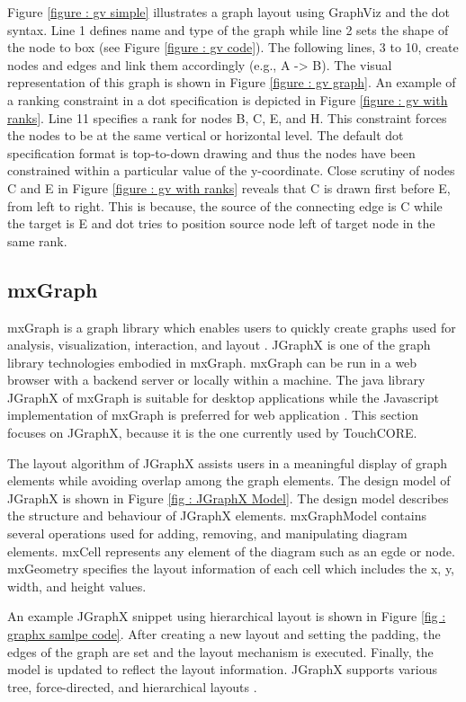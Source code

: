 Figure \ref{figure : gv simple} illustrates a graph layout using GraphViz and the dot syntax.  Line 1 defines name and type of the graph while line 2 sets the shape of the node to box (see Figure \ref{figure : gv code}). The following lines, 3 to 10, create nodes and edges and link them accordingly (e.g., A -> B). The visual representation of this graph is shown in Figure \ref{figure : gv graph}. An example of a ranking constraint in a dot specification is depicted in Figure \ref{figure : gv with ranks}. Line 11 specifies a rank for nodes B, C, E, and H. This constraint forces the nodes to be at the same vertical or horizontal level. The default dot specification format is top-to-down drawing and thus the nodes have been constrained within a particular value of the y-coordinate. Close scrutiny of nodes C and E in Figure \ref{figure : gv with ranks} reveals that C is drawn first before E, from left to right. This is because, the source of the connecting edge is C while the target is E and dot tries to position source node left of target node in the same rank.

\subsection{mxGraph} \label{mxgraph}
 mxGraph is a graph library which enables users to quickly create graphs used for analysis, visualization, interaction, and layout \cite{JgraphX}. JGraphX is one of the graph library technologies embodied in mxGraph. mxGraph can be run in a web browser with a backend server or locally within a machine. The java library JGraphX of mxGraph is suitable for desktop applications while the Javascript implementation of mxGraph is preferred for web application \cite{JgraphX}. This section focuses on JGraphX, because it is the one currently used by TouchCORE. 
 
The layout algorithm of JGraphX assists users in a meaningful display of graph elements while avoiding overlap among the graph elements. The design model of JGraphX is shown in Figure \ref{fig : JGraphX Model}. The design model describes the structure and behaviour of JGraphX elements. mxGraphModel contains several operations used for adding, removing, and manipulating diagram elements. mxCell represents any element of the diagram such as an egde or node. mxGeometry specifies the layout information of each cell which includes the x, y, width, and height values. 

An example JGraphX snippet using hierarchical layout \cite{hierarchical_drawing} is shown in Figure \ref{fig : graphx samlpe code}.  After creating a new layout and setting the padding, the edges of the graph are set and the layout mechanism is executed. Finally, the model is updated to reflect the layout information. JGraphX supports various tree, force-directed, and hierarchical layouts \cite{JgraphX}.
 
